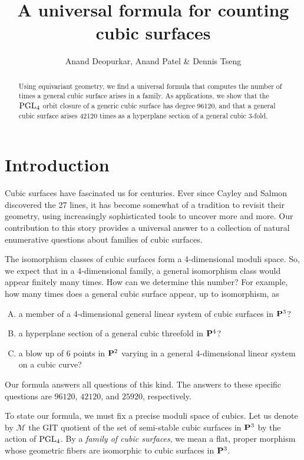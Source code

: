 \documentclass[12pt,reqno]{amsart}
\title{A universal formula for counting cubic surfaces}
\author{Anand Deopurkar, Anand Patel
  \& Dennis Tseng}
\numberwithin{equation}{section}
\begin{document}
\maketitle

\begin{abstract}
  Using equivariant geometry, we find a universal formula that computes the number of times a general cubic surface arises in a family.
  As applications, we show that the $\PGL_4$ orbit closure of a generic cubic surface has degree 96120, and that a general cubic surface arises 42120 times as a hyperplane section of a general cubic 3-fold.
\end{abstract}




\section{Introduction}
\label{sec:intro}

Cubic surfaces have fascinated us for centuries. Ever since Cayley and
Salmon discovered the 27 lines, it has become somewhat of a tradition
to revisit their geometry, using increasingly sophisticated tools to
uncover more and more. Our contribution to this story provides a
universal answer to a collection of natural enumerative questions
about families of cubic surfaces.

The isomorphism classes of cubic surfaces form a 4-dimensional moduli
space. So, we expect that in a 4-dimensional family, a general
isomorphism class would appear finitely many times. How can we
determine this number? For example, how many times does a general
cubic surface appear, up to isomorphism, as
\begin{enumerate}[(A)]
\item \label{orbit} a member of a 4-dimensional general linear system of cubic surfaces in $\P^3$?
\item \label{slice} a hyperplane section of a general cubic threefold in $\P^4$?
\item a blow up of 6 points in $\P^2$ varying in a general
  4-dimensional linear system on a cubic curve?
\end{enumerate}
Our formula answers all questions of this kind.  The answers to these
specific questions are $96120$, $42120$, and $25920$, respectively.

To state our formula, we must fix a precise moduli space of cubics.
Let us denote by $\mathcal M$ the GIT quotient of the set of
semi-stable cubic surfaces in $\P^3$ by the action of $\PGL_4$.  By a
{\sl family of cubic surfaces}, we mean a flat, proper morphism whose
geometric fibers are isomorphic to cubic surfaces in $\P^3$.
\end{document}
